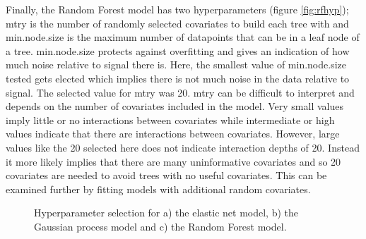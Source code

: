 \documentclass[10pt,]{article}
\begin{document}
Finally, the Random Forest model has two hyperparameters (figure \ref{fig:rfhyp}); mtry is the number of randomly selected covariates to build each tree with and min.node.size is the maximum number of datapoints that can be in a leaf node of a tree. min.node.size protects against overfitting and gives an indication of how much noise relative to signal there is. Here, the smallest value of min.node.size tested gets elected which implies there is not much noise in the data relative to signal. The selected value for mtry was 20. mtry can be difficult to interpret and depends on the number of covariates included in the model. Very small values imply little or no interactions between covariates while intermediate or high values indicate that there are interactions between covariates. However, large values like the 20 selected here does not indicate interaction depths of 20. Instead it more likely implies that there are many uninformative covariates and so 20 covariates are needed to avoid trees with no useful covariates. This can be examined further by fitting models with additional random covariates.


\begin{figure}[t!]
  \centering

  \label{fig:hyp}
  \caption{
    Hyperparameter selection for a) the elastic net model, b) the Gaussian process model and c) the Random Forest model.
  }
\end{figure}



\end{document}
